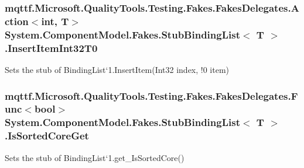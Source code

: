\hypertarget{class_system_1_1_component_model_1_1_fakes_1_1_stub_binding_list_3_01_t_01_4_a9953da842fe2ddd4cfcf865aff473f1a}{
\subsubsection[{Insert\-Item\-Int32\-T0}]{\setlength{\rightskip}{0pt plus 5cm}mqttf.\-Microsoft.\-Quality\-Tools.\-Testing.\-Fakes.\-Fakes\-Delegates.\-Action$<$int, T$>$ System.\-Component\-Model.\-Fakes.\-Stub\-Binding\-List$<$ T $>$.Insert\-Item\-Int32\-T0}}\label{class_system_1_1_component_model_1_1_fakes_1_1_stub_binding_list_3_01_t_01_4_a9953da842fe2ddd4cfcf865aff473f1a}


Sets the stub of Binding\-List`1.Insert\-Item(Int32 index, !0 item)

\hypertarget{class_system_1_1_component_model_1_1_fakes_1_1_stub_binding_list_3_01_t_01_4_a7877294c26fbf60afbb4c4ac08f13dab}{
\subsubsection[{Is\-Sorted\-Core\-Get}]{\setlength{\rightskip}{0pt plus 5cm}mqttf.\-Microsoft.\-Quality\-Tools.\-Testing.\-Fakes.\-Fakes\-Delegates.\-Func$<$bool$>$ System.\-Component\-Model.\-Fakes.\-Stub\-Binding\-List$<$ T $>$.Is\-Sorted\-Core\-Get}}\label{class_system_1_1_component_model_1_1_fakes_1_1_stub_binding_list_3_01_t_01_4_a7877294c26fbf60afbb4c4ac08f13dab}


Sets the stub of Binding\-List`1.get\-\_\-\-Is\-Sorted\-Core()

